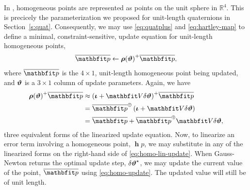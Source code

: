 \documentclass[11pt,a4,oneside]{article}
\begin{document}
In \citet{FurgaleThesis}, homogeneous points are represented as points on the unit sphere in $\mathbb R^{4}$. This is precicely the parameterization we proposed for unit-length quaternions in Section~\ref{s:quat}. Consequently, we may use \eqref{eq:quatplus} and \eqref{eq:hartley-map} to define a minimal, constraint-sensitive, update equation for unit-length homogeneous points,
\begin{equation}
  \label{eq:homo-update}
  \mbfhbar p \leftarrow \qc{\mbs \rho(\mbs \vartheta)} \mbfhbar p,
\end{equation}
where $\mbfhbar p$ is the $4 \times 1$, unit-length homogeneous point being updated, and ${\boldsymbol{\vartheta}}$ is a $3 \times 1$ column of update parameters. Again, we have
\begin{subequations}
  \label{eq:homo-lin-update}
  \begin{flalign}
    \qc{\mbs \rho(\mbs \vartheta)} \mbfhbar p & \approx \qc{ \left( \mbs \iota +  \mbfh V \mbsdel \vartheta \right) }\mbfhbar p \\
                                         & =  \qo{\mbfhbar p} \left( \mbs \iota +  \mbfh V \mbsdel \vartheta \right)\\
                                         & =  \mbfhbar p   + \qo{\mbfhbar p} \mbfh V \mbsdel \vartheta,
  \end{flalign}
\end{subequations}
three equivalent forms of the linearized update equation. Now, to linearize an error term involving a homogeneous point, $\mbfh p$, we may substitute in any of the linearized forms on the right-hand side of \eqref{eq:homo-lin-update}. When Gauss-Newton returns the optimal update step, ${\delta {\boldsymbol{\vartheta}}}^\star$, we may update the current value of the point, $\mbfhbar p$ using \eqref{eq:homo-update}.
The updated value will still be of unit length. 
\end{document}

